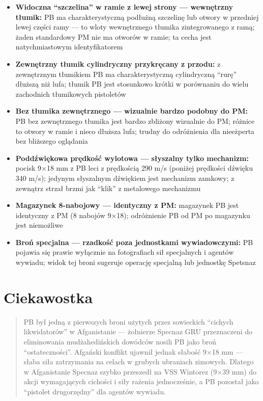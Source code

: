 \documentclass[12pt,openany,oneside]{book}
\providecommand{\tightlist}{%
  \setlength{\itemsep}{0pt}\setlength{\parskip}{0pt}}
\begin{document}
\begin{itemize}
\tightlist
\item
  \textbf{Widoczna ``szczelina'' w ramie z lewej strony --- wewnętrzny
  tłumik:} PB ma charakterystyczną podłużną szczelinę lub otwory w
  przedniej lewej części ramy --- to wloty wewnętrznego tłumika
  zintegrowanego z ramą; żaden standardowy PM nie ma otworów w ramie; ta
  cecha jest natychmiastowym identyfikatorem
\item
  \textbf{Zewnętrzny tłumik cylindryczny przykręcany z przodu:} z
  zewnętrznym tłumikiem PB ma charakterystyczną cylindryczną ``rurę''
  dłuższą niż lufa; tłumik PB jest stosunkowo krótki w porównaniu do
  wielu zachodnich tłumikowych pistoletów
\item
  \textbf{Bez tłumika zewnętrznego --- wizualnie bardzo podobny do PM:}
  PB bez zewnętrznego tłumika jest bardzo zbliżony wizualnie do PM;
  różnice to otwory w ramie i nieco dłuższa lufa; trudny do odróżnienia
  dla nieeżperta bez bliższego oglądania
\item
  \textbf{Poddźwiękowa prędkość wylotowa --- słyszalny tylko mechanizm:}
  pocisk 9×18 mm z PB leci z prędkością 290 m/s (poniżej prędkości
  dźwięku 340 m/s); jedynym słyszalnym dźwiękiem jest mechanizm zamkowy;
  z zewnątrz strzał brzmi jak ``klik'' z metalowego mechanizmu
\item
  \textbf{Magazynek 8-nabojowy --- identyczny z PM:} magazynek PB jest
  identyczny z PM (8 nabojów 9×18); odróżnienie PB od PM po magazynku
  jest niemożliwe
\item
  \textbf{Broń specjalna --- rzadkość poza jednostkami wywiadowczymi:}
  PB pojawia się prawie wyłącznie na fotografiach sił specjalnych i
  agentów wywiadu; widok tej broni sugeruje operację specjalną lub
  jednostkę Spetsnaz
\end{itemize}

\section{Ciekawostka}\label{ciekawostka-89}

\begin{quote}
PB był jedną z pierwszych broni użytych przez sowieckich ``cichych
likwidatorów'' w Afganistanie --- żołnierze Specnaz GRU przeznaczeni do
eliminowania mudżahedińskich dowódców nosili PB jako broń
``ostateczności''. Afgański konflikt ujawnił jednak słabość 9×18 mm ---
słaba siła zatrzymania na celach w grubych ubraniach zimowych. Dlatego w
Afganistanie Specnaz szybko przeszedł na VSS Wintorez (9×39 mm) do akcji
wymagających cichości i siły rażenia jednocześnie, a PB pozostał jako
``pistolet drugorzędny'' dla agentów wywiadu.
\end{quote}
\end{document}
